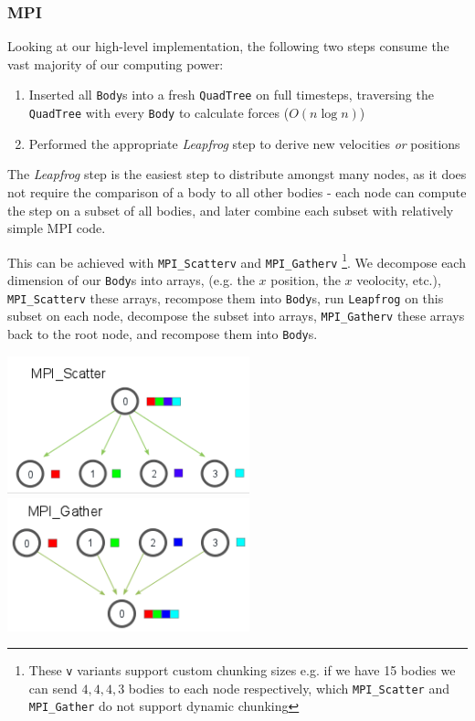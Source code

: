 \documentclass[11pt,a4paper]{article}
\begin{document}

\subsubsection*{MPI}

Looking at our high-level implementation, the following two steps consume the vast majority of our computing power:

\begin{enumerate}
    \item Inserted all \texttt{Body}s into a fresh \texttt{QuadTree} on full timesteps, traversing the \texttt{QuadTree} with every \texttt{Body} to calculate forces ($O(n \log n)$)
    \item Performed the appropriate \textit{Leapfrog} step to derive new velocities \textit{or} positions
\end{enumerate}

The \textit{Leapfrog} step is the easiest step to distribute amongst many nodes, as it does not require the comparison of a body to all other bodies - each node can compute the step on a subset of all bodies, and later combine each subset with relatively simple MPI code.

This can be achieved with \texttt{MPI\_Scatterv} and \texttt{MPI\_Gatherv}
\footnote{These \texttt{v} variants support custom chunking sizes e.g. if we have 15 bodies we can send $4, 4, 4, 3$ bodies to each node respectively, which \texttt{MPI\_Scatter} and \texttt{MPI\_Gather} do not support dynamic chunking}. We decompose each dimension of our \texttt{Body}s into arrays, (e.g. the $x$ position, the $x$ veolocity, etc.), \texttt{MPI\_Scatterv} these arrays, recompose them into \texttt{Body}s, run \texttt{Leapfrog} on this subset on each node, decompose the subset into arrays, \texttt{MPI\_Gatherv} these arrays back to the root node, and recompose them into \texttt{Body}s.

\includegraphics[width=7cm]{mpi_scatter}
\includegraphics[width=7cm]{mpi_gather}
\end{document}
